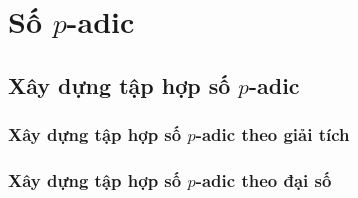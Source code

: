 \chapter{Số $p$-adic}\label{chapter:p-adic}

\section{Xây dựng tập hợp số $p$-adic}

\subsection{Xây dựng tập hợp số $p$-adic theo giải tích}

\subsection{Xây dựng tập hợp số $p$-adic theo đại số}

